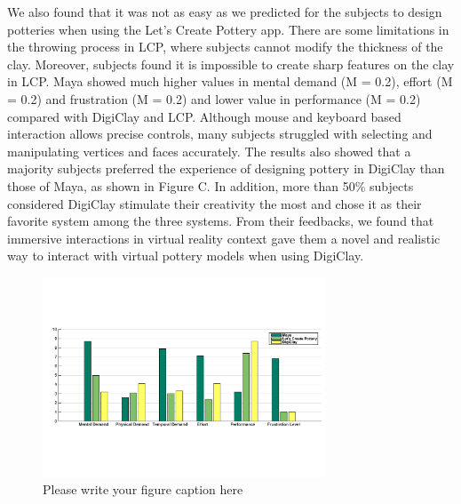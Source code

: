 We also found that it was not as easy as we predicted for the subjects to design potteries when using the Let's Create Pottery app. There are some limitations in the throwing process in LCP, where subjects cannot modify the thickness of the clay. Moreover, subjects found it is impossible to create sharp features on the clay in LCP. 
Maya showed much higher values in mental demand (M = 0.2), effort (M = 0.2) and frustration (M = 0.2) and lower value in performance (M = 0.2) compared with DigiClay and LCP. Although mouse and keyboard based interaction allows precise controls, many subjects struggled with selecting and manipulating vertices and faces accurately.
The results also showed that a majority subjects preferred the experience of designing pottery in DigiClay than those of Maya, as shown in Figure C. In addition, more than 50\% subjects considered DigiClay stimulate their creativity the most and chose it as their favorite system among the three systems. From their feedbacks, we found that immersive interactions in virtual reality context gave them a novel and realistic way to interact with virtual pottery models when using DigiClay.
\begin{figure}
  \includegraphics[width=0.75\textwidth]{f7.pdf}
\caption{Please write your figure caption here}
\label{fig:1}       %
\end{figure}

